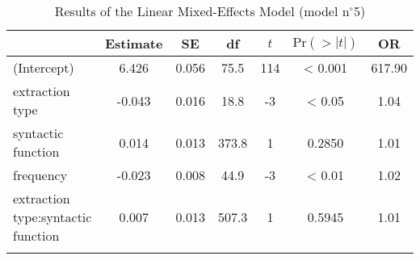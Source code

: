 \begin{table}
\begin{tabularx}{\textwidth}{Q S[table-format=-1.3] S[table-format=1.3] S[table-format=3.1] S[table-format=-3] S[table-format=<1.4] S[table-format=3.2] }
  \lsptoprule
 & {Estimate} & {SE} & {df} & {$t$} & {$\text{Pr}(>|t|)$} & {OR} \\ 
  \midrule
(Intercept) & 6.426 & 0.056 & 75.5 & 114 & < 0.001 & 617.90 \\ 
  extraction type & -0.043 & 0.016 & 18.8 & -3 & < 0.05 & 1.04 \\ 
  syntactic function & 0.014 & 0.013 & 373.8 & 1 & 0.2850 & 1.01 \\ 
  frequency & -0.023 & 0.008 & 44.9 & -3 & < 0.01 & 1.02 \\ 
  extraction type:syntactic function & 0.007 & 0.013 & 507.3 & 1 & 0.5945 & 1.01 \\ 
   \lspbottomrule
\end{tabularx}
\caption{Results of the Linear Mixed-Effects Model (model n$^{\circ}$5)}
\label{tab:exp09-m5}
\end{table}
